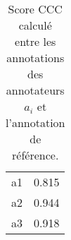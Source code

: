 \begin{table}
  \centering
  \begin{tabular}{|l|c|}
  \hline
  a1       &0.815 \\
  a2       &0.944 \\
  a3       &0.918 \\
  \hline
  \end{tabular}
  \caption{Score CCC calculé entre les annotations des annotateurs $a_i$ et l'annotation de référence.}
  \label{tab:cccEntreAnnotateurs}
\end{table}
